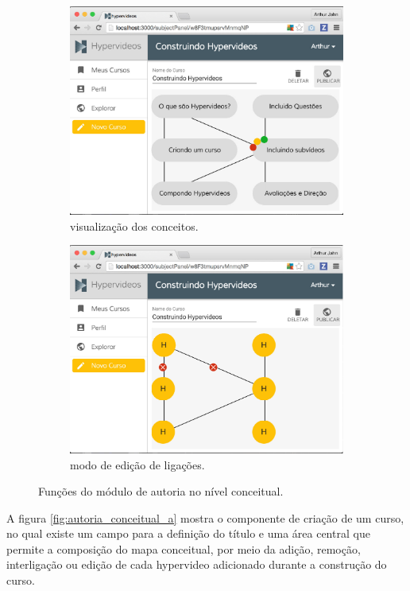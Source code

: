 \begin{figure}[h!]
	\begin{subfigure}{.5\textwidth}
  		\centering
  		\includegraphics[width=.9\linewidth]{figuras/autoria_conceitual_c.eps}
  		\caption{visualização dos conceitos.}
  		\label{fig:autoria_conceitual_c}
	\end{subfigure}%
	\begin{subfigure}{.5\textwidth}
  		\centering
  		\includegraphics[width=.9\linewidth]{figuras/autoria_conceitual_d.eps}
  		\caption{modo de edição de ligações.}
  		\label{fig:autoria_conceitual_d}
	\end{subfigure}%
  	\caption{Funções do módulo de autoria no nível conceitual.}
  	\label{fig:autoria_conceitual}
\end{figure}

A figura \ref{fig:autoria_conceitual_a} mostra o componente de criação de um curso, no qual existe um campo para a definição do título e uma área central que permite a composição do mapa conceitual, por meio da adição, remoção, interligação ou edição de cada hypervideo adicionado durante a construção do curso.

